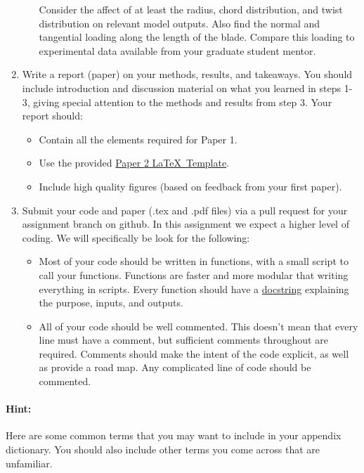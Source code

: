 \documentclass[12pt]{article}
\begin{document}
\begin{enumerate}
\begin{enumerate}
		Consider the affect of at least the radius, chord distribution, and twist distribution on relevant model outputs.
		Also find the normal and tangential loading along the length of the blade. Compare this loading to experimental data available from your graduate student mentor.   %
	\end{enumerate}
		\item Write a report (paper) on your methods, results, and takeaways. You should include introduction and discussion material on what you learned in steps 1-3, giving special attention to the methods and results from step 3. Your report should:
	\begin{itemize}
		\item Contain all the elements required for Paper 1.
		\item Use the provided \href{https://github.com/byuflowlab/undergrad-onboarding/tree/497R/497R/latex_templates/paper2_asme}{Paper 2 \LaTeX~Template}.
		\item Include high quality figures (based on feedback from your first paper).
	\end{itemize}
	\item Submit your code and paper (.tex and .pdf files) via a pull request for your assignment branch on github. In this assignment we expect a higher level of coding. We will specifically be look for the following: 
	\begin{itemize}
		\item Most of your code should be written in functions, with a small script to call your functions. Functions are faster and more modular that writing everything in scripts.  Every function should have a \href{https://docs.julialang.org/en/v1/manual/documentation/#Writing-Documentation}{docstring} explaining the purpose, inputs, and outputs. 
		\item All of your code should be well commented. This doesn't mean that every line must have a comment, but sufficient comments throughout are required. Comments should make the intent of the code explicit, as well as provide a road map. Any complicated line of code should be commented. 
	\end{itemize}
\end{enumerate}

\bigskip

\paragraph{Hint:} Here are some common terms that you may want to include in your appendix dictionary. You should also include other terms you come across that are unfamiliar.
\end{document}
